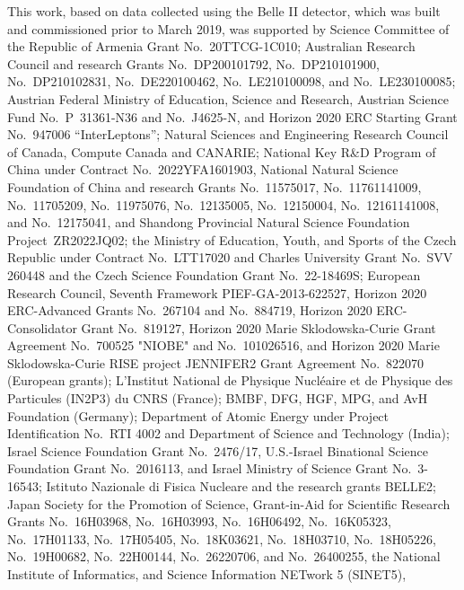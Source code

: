 This work, based on data collected using the Belle II detector, which was built and commissioned prior to March 2019, was supported by
Science Committee of the Republic of Armenia Grant No.~20TTCG-1C010;
Australian Research Council and research Grants
No.~DP200101792, %
No.~DP210101900, %
No.~DP210102831, %
No.~DE220100462, %
No.~LE210100098, %
and
No.~LE230100085; %
Austrian Federal Ministry of Education, Science and Research,
Austrian Science Fund
No.~P~31361-N36
and
No.~J4625-N,
and
Horizon 2020 ERC Starting Grant No.~947006 ``InterLeptons'';
Natural Sciences and Engineering Research Council of Canada, Compute Canada and CANARIE;
National Key R\&D Program of China under Contract No.~2022YFA1601903,
National Natural Science Foundation of China and research Grants
No.~11575017,
No.~11761141009,
No.~11705209,
No.~11975076,
No.~12135005,
No.~12150004,
No.~12161141008,
and
No.~12175041,
and Shandong Provincial Natural Science Foundation Project~ZR2022JQ02;
the Ministry of Education, Youth, and Sports of the Czech Republic under Contract No.~LTT17020 and
Charles University Grant No.~SVV 260448 and
the Czech Science Foundation Grant No.~22-18469S;
European Research Council, Seventh Framework PIEF-GA-2013-622527,
Horizon 2020 ERC-Advanced Grants No.~267104 and No.~884719,
Horizon 2020 ERC-Consolidator Grant No.~819127,
Horizon 2020 Marie Sklodowska-Curie Grant Agreement No.~700525 "NIOBE"
and
No.~101026516,
and
Horizon 2020 Marie Sklodowska-Curie RISE project JENNIFER2 Grant Agreement No.~822070 (European grants);
L'Institut National de Physique Nucl\'{e}aire et de Physique des Particules (IN2P3) du CNRS (France);
BMBF, DFG, HGF, MPG, and AvH Foundation (Germany);
Department of Atomic Energy under Project Identification No.~RTI 4002 and Department of Science and Technology (India);
Israel Science Foundation Grant No.~2476/17,
U.S.-Israel Binational Science Foundation Grant No.~2016113, and
Israel Ministry of Science Grant No.~3-16543;
Istituto Nazionale di Fisica Nucleare and the research grants BELLE2;
Japan Society for the Promotion of Science, Grant-in-Aid for Scientific Research Grants
No.~16H03968,
No.~16H03993,
No.~16H06492,
No.~16K05323,
No.~17H01133,
No.~17H05405,
No.~18K03621,
No.~18H03710,
No.~18H05226,
No.~19H00682, %
No.~22H00144,
No.~26220706,
and
No.~26400255,
the National Institute of Informatics, and Science Information NETwork 5 (SINET5), 
